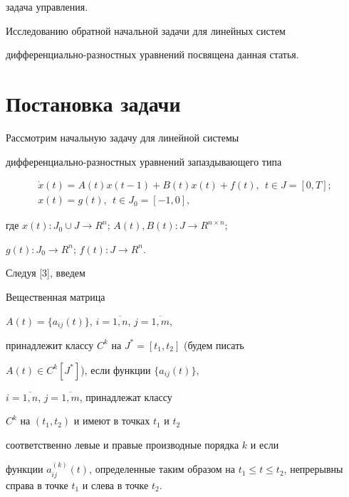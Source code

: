 задача управления.





Исследованию обратной начальной задачи для линейных систем


дифференциально-раз\-ност\-ных уравнений посвящена данная статья.








\section{Постановка задачи}





Рассмотрим начальную задачу для линейной системы


дифференциально-разностных уравнений запаздывающего типа


\begin{gather}


\Dot{x}(t)=A(t)x(t-1)+B(t)x(t)+f(t),\ \ t\in J=[0,T];\\


%


x(t)=g(t),\ \ t\in J_0=[-1,0],


\end{gather}


где $x(t):J_0\cup J \to R^n$; $A(t), B(t):J \to R^{n\times n}$;


$g(t):J_0 \to R^n$; $f(t):J \to R^n$.





Следуя [3], введем 





\begin{defn}


Вещественная матрица


$A(t)=\{a_{ij}(t)\}$, $i=\overline{1,n}$, $j=\overline{1,m}$,


принадлежит классу $C^k$ на $J^*=[t_1,t_2]$ (будем писать


$A(t)\in C^k[J^*]$), если функции $\{a_{ij}(t)\}$,


$i=\overline{1,n}$, $j=\overline{1,m}$, принадлежат классу


$C^k$ на $(t_1,t_2)$ и имеют в точках $t_1$ и $t_2$


соответственно левые и правые производные порядка $k$ и если


функции $a_{ij}^{(k)}(t)$, определенные таким образом на $t_1\leq t


\leq t_2$, непрерывны справа в точке $t_1$ и слева в точке $t_2$.


\end{defn}





